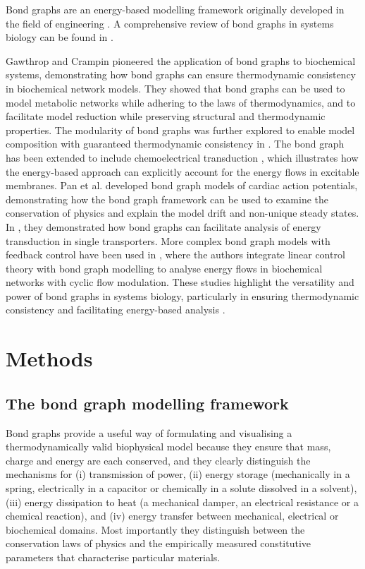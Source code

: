 \documentclass{biophys-new}
\begin{document}
Bond graphs are an energy-based modelling framework originally developed in the field of engineering \cite{paynter1961analysis,karnopp2012system,breedveld1985multibond}. A comprehensive review of bond graphs in systems biology can be found in \cite{akbarpour_ghazani_review_2024}.

Gawthrop and Crampin \cite{gawthrop_energy-based_2014} pioneered the application of bond graphs to biochemical systems, demonstrating how bond graphs can ensure thermodynamic consistency in biochemical network models.
They showed that bond graphs can be used to model metabolic networks while adhering to the laws of thermodynamics, and to facilitate model reduction while preserving structural and thermodynamic properties.
The modularity of bond graphs was further explored to enable model composition with guaranteed thermodynamic consistency in \cite{gawthrop_hierarchical_2015,shahidi_hierarchical_2021,shahidi_sbml_2022,safaei_bond_2018}.
The bond graph has been extended to include chemoelectrical transduction \cite{gawthrop_bond_2017-1}, which illustrates how the energy-based approach can explicitly account for the energy flows in excitable membranes.
Pan et al. \cite{pan_bond_2018,pan_bond_2019} developed bond graph models of cardiac action potentials, demonstrating how the bond graph framework can be used to examine the conservation of physics and explain the model drift and non-unique steady states.
In \cite{gawthrop_energy-based_2017}, they demonstrated how bond graphs can facilitate analysis of energy transduction in single transporters. More complex bond graph models with feedback control have been used in \cite{gawthrop_energy-based_2021}, where the authors integrate linear control theory with bond graph modelling to analyse energy flows in biochemical networks with cyclic flow modulation.
These studies highlight the versatility and power of bond graphs in systems biology, particularly in ensuring thermodynamic consistency and facilitating energy-based analysis \cite{gawthrop_network_2022}.

\section*{Methods}
\subsection*{The bond graph modelling framework}

Bond graphs provide a useful way of formulating and visualising a thermodynamically valid biophysical model because they ensure that mass, charge and energy are each conserved, and they clearly distinguish the mechanisms for (i) transmission of power, (ii) energy storage (mechanically in a spring, electrically in a capacitor or chemically in a solute dissolved in a solvent), (iii) energy dissipation to heat (a mechanical damper, an electrical resistance or a chemical reaction), and (iv) energy transfer between mechanical, electrical or biochemical domains. Most importantly they distinguish between the conservation laws of physics and the empirically measured constitutive parameters that characterise particular materials.
\end{document}
